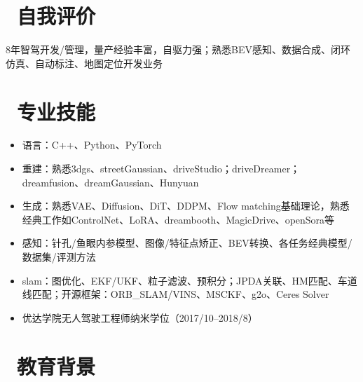 \documentclass{resume}
\begin{document}




\section{\faBook\ 自我评价}
8年智驾开发/管理，量产经验丰富，自驱力强；熟悉BEV感知、数据合成、闭环仿真、自动标注、地图定位开发业务

\section{\faCogs\ 专业技能}
\begin{itemize}[parsep=0.5ex]
  \item 语言：C++、Python、PyTorch
  \item 重建：熟悉3dgs、streetGaussian、driveStudio；driveDreamer；dreamfusion、dreamGaussian、Hunyuan
  \item 生成：熟悉VAE、Diffusion、DiT、DDPM、Flow matching基础理论，熟悉经典工作如ControlNet、LoRA、dreambooth、MagicDrive、openSora等
  \item 感知：针孔/鱼眼内参模型、图像/特征点矫正、BEV转换、各任务经典模型/数据集/评测方法
  \item slam：图优化、EKF/UKF、粒子滤波、预积分；JPDA关联、HM匹配、车道线匹配；开源框架：ORB\_SLAM/VINS、MSCKF、g2o、Ceres Solver
  \item 优达学院无人驾驶工程师纳米学位（2017/10--2018/8）
\end{itemize}

\section{\faGraduationCap\  教育背景}
\end{document}
